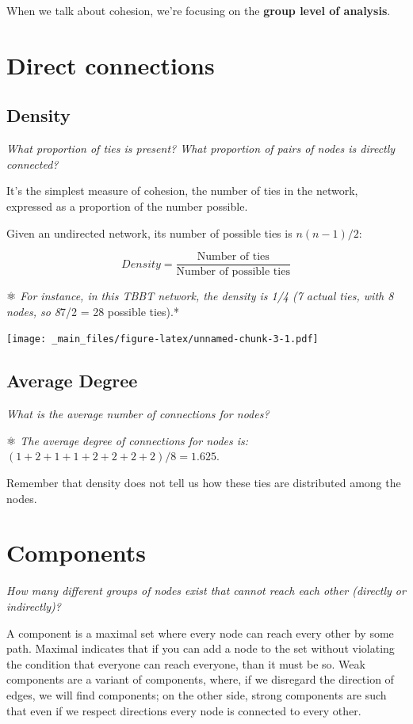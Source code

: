 \documentclass[
  notitlepage,
  onecolumn,
  openany]{book}
\begin{document}
When we talk about cohesion, we're focusing on the \textbf{group level of analysis}.

\hypertarget{direct-connections}{%
\section{Direct connections}\label{direct-connections}}

\hypertarget{density}{%
\subsection{Density}\label{density}}

\emph{What proportion of ties is present? What proportion of pairs of nodes is directly connected?}

It's the simplest measure of cohesion, the number of ties in the network, expressed as a proportion of the number possible.

Given an undirected network, its number of possible ties is \(n(n-1)/2\):

\[
Density = \frac{\text{Number of ties}}{\text{Number of possible ties}}
\]

⚛️ \emph{For instance, in this TBBT network, the density is 1/4 (7 actual ties, with 8 nodes, so 8}7/2 = 28 possible ties).*

\texttt{[image: \_main\_files/figure-latex/unnamed-chunk-3-1.pdf]}

\hypertarget{average-degree-1}{%
\subsection{Average Degree}\label{average-degree-1}}

\emph{What is the average number of connections for nodes?}

⚛️ \emph{The average degree of connections for nodes is:} \((1+2+1+1+2+2+2+2)/8 = 1.625\).

Remember that density does not tell us how these ties are distributed among the nodes.

\hypertarget{components}{%
\section{Components}\label{components}}

\emph{How many different groups of nodes exist that cannot reach each other (directly or indirectly)?}

A component is a maximal set where every node can reach every other by some path. Maximal indicates that if you can add a node to the set without violating the condition that everyone can reach everyone, than it must be so. Weak components are a variant of components, where, if we disregard the direction of edges, we will find components; on the other side, strong components are such that even if we respect directions every node is connected to every other.
\end{document}
